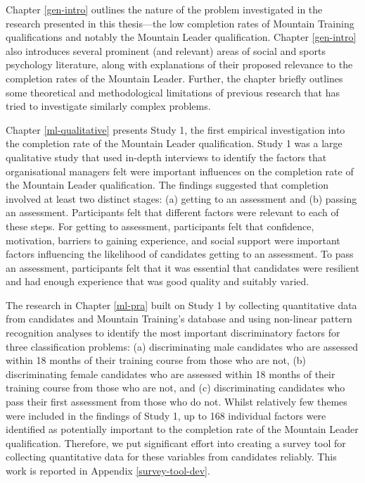 \documentclass[
  12pt,
  a4paper,
]{book}
\begin{document}
Chapter \ref{gen-intro} outlines the nature of the problem investigated in the research presented in this thesis---the low completion rates of Mountain Training qualifications and notably the Mountain Leader qualification. Chapter \ref{gen-intro} also introduces several prominent (and relevant) areas of social and sports psychology literature, along with explanations of their proposed relevance to the completion rates of the Mountain Leader. Further, the chapter briefly outlines some theoretical and methodological limitations of previous research that has tried to investigate similarly complex problems.

Chapter \ref{ml-qualitative} presents Study 1, the first empirical investigation into the completion rate of the Mountain Leader qualification. Study 1 was a large qualitative study that used in-depth interviews to identify the factors that organisational managers felt were important influences on the completion rate of the Mountain Leader qualification. The findings suggested that completion involved at least two distinct stages: (a) getting to an assessment and (b) passing an assessment. Participants felt that different factors were relevant to each of these steps. For getting to assessment, participants felt that confidence, motivation, barriers to gaining experience, and social support were important factors influencing the likelihood of candidates getting to an assessment. To pass an assessment, participants felt that it was essential that candidates were resilient and had enough experience that was good quality and suitably varied.

The research in Chapter \ref{ml-pra} built on Study 1 by collecting quantitative data from candidates and Mountain Training's database and using non-linear pattern recognition analyses to identify the most important discriminatory factors for three classification problems: (a) discriminating male candidates who are assessed within 18 months of their training course from those who are not, (b) discriminating female candidates who are assessed within 18 months of their training course from those who are not, and (c) discriminating candidates who pass their first assessment from those who do not. Whilst relatively few themes were included in the findings of Study 1, up to 168 individual factors were identified as potentially important to the completion rate of the Mountain Leader qualification. Therefore, we put significant effort into creating a survey tool for collecting quantitative data for these variables from candidates reliably. This work is reported in Appendix \ref{survey-tool-dev}.
\end{document}
